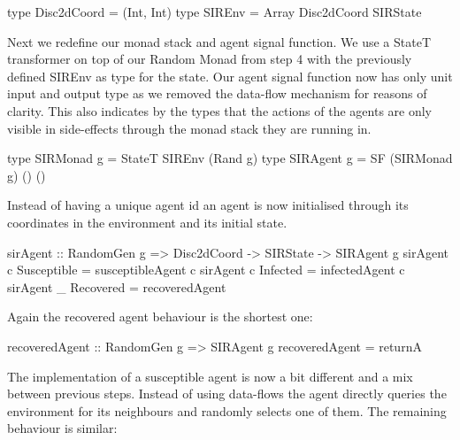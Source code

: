 \begin{HaskellCode}
type Disc2dCoord = (Int, Int)
type SIREnv      = Array Disc2dCoord SIRState
\end{HaskellCode}

Next we redefine our monad stack and agent signal function. We use a StateT transformer on top of our Random Monad from step 4 with the previously defined SIREnv as type for the state. Our agent signal function now has only unit input and output type as we removed the data-flow mechanism for reasons of clarity. This also indicates by the types that the actions of the agents are only visible in side-effects through the monad stack they are running in.

\begin{HaskellCode}
type SIRMonad g = StateT SIREnv (Rand g)
type SIRAgent g = SF (SIRMonad g) () ()
\end{HaskellCode}

Instead of having a unique agent id an agent is now initialised through its coordinates in the environment and its initial state. 

\begin{HaskellCode}
sirAgent :: RandomGen g => Disc2dCoord -> SIRState -> SIRAgent g
sirAgent c Susceptible = susceptibleAgent c
sirAgent c Infected    = infectedAgent c
sirAgent _ Recovered   = recoveredAgent
\end{HaskellCode}

Again the recovered agent behaviour is the shortest one:
\begin{HaskellCode}
recoveredAgent :: RandomGen g => SIRAgent g
recoveredAgent = returnA
\end{HaskellCode}

The implementation of a susceptible agent is now a bit different and a mix between previous steps. Instead of using data-flows the agent directly queries the environment for its neighbours and randomly selects one of them. The remaining behaviour is similar:

